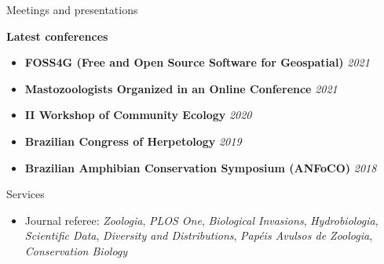 \documentclass{resume}
\begin{document}

\begin{rSection}{Meetings and presentations}

{\bf Latest conferences}
\begin{itemize}
\item {\bf FOSS4G (Free and Open Source Software for Geospatial)} \hfill{\em 2021}
\item {\bf Mastozoologists Organized in an Online Conference} \hfill{\em 2021}
\item {\bf II Workshop of Community Ecology} \hfill{\em 2020}
\item {\bf Brazilian Congress of Herpetology} \hfill{\em 2019}
\item {\bf Brazilian Amphibian Conservation Symposium (ANFoCO)} \hfill{\em 2018}
\end{itemize}

\end{rSection}


\begin{rSection}{Services}
\begin{itemize}
\item Journal referee: {\it Zoologia}, {\it PLOS One}, {\it Biological Invasions}, {\it Hydrobiologia}, {\it Scientific Data}, {\it Diversity and Distributions}, {\it Papéis Avulsos de Zoologia}, {\it Conservation Biology}
\end{itemize}
\end{rSection}

\end{document}
